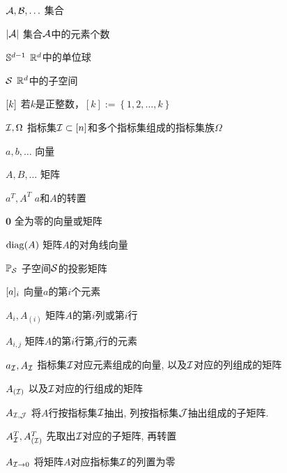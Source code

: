 ﻿\begin{denotation}
\item[\(\cA, \cB, \ldots\)] 集合
\item[\(|\cA|\)] 集合\(\cA\)中的元素个数
\item[\(\S^{d-1}\)] \(\R^d\)中的单位球
\item[\(\cS\)] \(\R^d\)中的子空间
\item[\([k\char"005D\)] 若\(k\)是正整数，\([k]:=\left\{ 1, 2, \ldots,k \right\}\)
\item[\(\cI, \Omega\)] 指标集\(\cI\subset [n]\)和多个指标集组成的指标集族\(\Omega\)

\item[\(a, b, \ldots\)] 向量
\item[\(A, B, \ldots\)] 矩阵 
\item[\(a^T, A^T\)] \(a\)和\(A\)的转置 
\item[\(\mathbf{0}\)] 全为零的向量或矩阵 
\item[\(\diag(A)\)] 矩阵\(A\)的对角线向量
\item[\(\P_\cS\)] 子空间\(\cS\)的投影矩阵
\item [\([a\char"005D_i \)] 向量\(a\)的第\(i\)个元素
\item[\(A_i, A_{(i)}\) ] 矩阵\(A\)的第\(i\)列或第\(i\)行
\item[\(A_{i, j}\) ] 矩阵\(A\)的第\(i\)行第\(j\)行的元素
\item[\(a_{\cI}, A_{\cI}\)] 指标集\(\cI\)对应元素组成的向量, 以及\(\cI\)对应的列组成的矩阵 
\item[\(A_{(\cI)}\)] 以及\(\cI\)对应的行组成的矩阵 
\item[\(A_{\cI, \cJ}\)] 将\(A\)行按指标集\(\cI\)抽出, 列按指标集\(\cJ\)抽出组成的子矩阵. 
\item[\(A_\cI^T, A_{(\cI)}^T\)] 先取出\(\cI\)对应的子矩阵, 再转置
\item[\(A_{\cI\rightarrow 0}\)] 将矩阵\(A\)对应指标集\(\cI\)的列置为零


\end{denotation}
